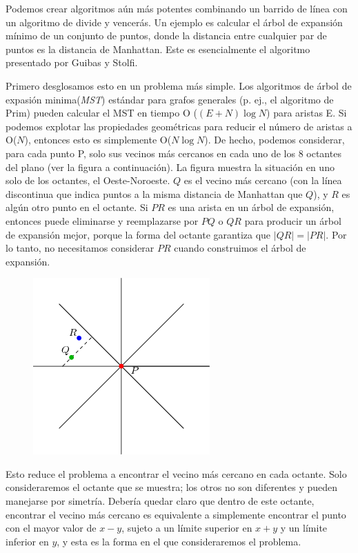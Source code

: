 Podemos crear algoritmos aún más potentes combinando un barrido de línea con un algoritmo de divide y vencerás. Un ejemplo es calcular el árbol de expansión mínimo de un conjunto de puntos, donde la distancia entre cualquier par de puntos es la distancia de Manhattan. Este es esencialmente el algoritmo presentado por Guibas y Stolfi.

Primero desglosamos esto en un problema más simple. Los algoritmos de árbol de expasión minima(\emph{MST}) estándar para grafos generales (p. ej., el algoritmo de Prim) pueden calcular el MST en tiempo O ($(E + N)\log N$) para aristas E. Si podemos explotar las propiedades geométricas para reducir el número de aristas a O($N$), entonces esto es simplemente O($N \log N$). De hecho, podemos considerar, para cada punto P, solo sus vecinos más cercanos en cada uno de los 8 octantes del plano (ver la figura a continuación). La figura muestra la situación en uno solo de los octantes, el Oeste-Noroeste. $Q$ es el vecino más cercano (con la línea discontinua que indica puntos a la misma distancia de Manhattan que $Q$), y $R$ es algún otro punto en el octante. Si $PR$ es una arista en un árbol de expansión, entonces puede eliminarse y reemplazarse por $PQ$ o $QR$ para producir un árbol de expansión mejor, porque la forma del octante garantiza que $|QR| = |PR|$. Por lo tanto, no necesitamos considerar $PR$ cuando construimos el árbol de expansión.

\begin{figure}[!h]
	\centering
	\includegraphics[width=0.25\linewidth]{img/octants}
	\label{fig:octants}
\end{figure}

Esto reduce el problema a encontrar el vecino más cercano en cada octante. Solo consideraremos el octante que se muestra; los otros no son diferentes y pueden manejarse por simetría. Debería quedar claro que dentro de este octante, encontrar el vecino más cercano es equivalente a simplemente encontrar el punto con el mayor valor de $x - y$, sujeto a un límite superior en $x + y$ y un límite inferior en $y$, y esta es la forma en el que consideraremos el problema.

